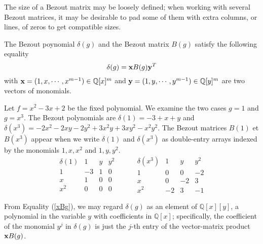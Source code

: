 \documentclass{standalone}
\begin{document}
\begin{rem}
\begin{rem}
The size of a Bezout matrix may be loosely defined; when working with several Bezout matrices, it may be desirable to pad some of them with extra columns, or lines, of zeros to get compatible sizes.
\end{rem}
\begin{rem}
The Bezout poynomial $\delta(g)$ and the Bezout matrix $B(g)$ satisfy the following equality
\begin{equation}
	\label{xBg}
	\delta(g) = \bold{x} B(g) \bold{y}^T
\end{equation}
with $\bold{x} = (1, x,\cdots, x^{m-1}) \in \mathbb{Q}[x]^m$ and $\bold{y} = (1, y,\cdots, y^{m-1}) \in \mathbb{Q}[y]^m$ are two vectors of monomials.
\end{rem}

\begin{exmp}
\label{exmp_1}
Let $f = x^2 - 3x + 2$ be the fixed polynomial. We examine the two cases $g=1$ and $g = x^3$. The Bezout polynomials are $\delta(1) = -3 + x + y$ and $\delta(x^3) = -2x^2 - 2xy -2y^2 + 3x^2y + 3xy^2 -x^2y^2$. The Bezout matrices $B(1)$ et $B(x^3)$ appear when we write  $\delta(1)$ and  $\delta(x^3)$ as double-entry arrays indexed by the monomials $1, x, x^2$ and $1, y, y^2$.
$$
\begin{array}{c|ccc}
\delta(1) & 1 & y & y^2\\
\hline
1 & -3 & 1 & 0\\
x & 1 & 0 & 0\\
x^2 & 0 & 0 & 0
\end{array}
\hspace{1cm}
\begin{array}{c|ccc}
\delta(x^3) & 1 & y & y^2\\
\hline
1 & 0 & 0 & -2\\
x & 0 & -2 & 3\\
x^2 & -2 & 3 & -1
\end{array}
$$
\end{exmp}

From Equality (\ref{xBg}), we may regard $\delta(g)$ as an element of $\mathbb{Q}[x][y]$, a polynomial in the variable $y$ with coefficients in $\mathbb{Q}[x]$; specifically, the coefficient of the monomial $y^j$ in $\delta(g)$ is just the $j$-th entry of the vector-matrix product $\bold{x} B(g)$.





\end{rem}
\end{document}
